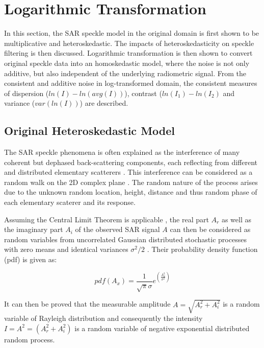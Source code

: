 \documentclass[journal]{IEEEtran}
\begin{document}
\section{Logarithmic Transformation}
\label{sec:log_transform}

In 
this section, the SAR speckle model in the original domain is first shown to be multiplicative and heteroskedastic.
The impacts of heteroskedasticity on speckle filtering is then discussed.
Logarithmic transformation is then shown to convert original speckle data into an homoskedastic model, 
	where the noise is not only additive, but also independent of the underlying radiometric signal.
From the consistent and additive noise in log-transformed domain,
    the consistent measures of dispersion ($ln(I)-ln(avg(I))$), contrast ($ln(I_1)-ln(I_2)$ and 
	variance ($var(ln(I))$) are described.

\subsection{Original Heteroskedastic Model}

The SAR speckle phenomena is often explained as the interference of many coherent but dephased back-scattering components,
	each reflecting from different and distributed elementary scatterers \cite{Oliver_ProcIEEE_1963, 
	Leith_ProcIEEE_1971}. This interference can be considered as a random walk on the 2D complex plane 
	\cite{Goodman_JOptSocAm_76}.  The random nature of the process arises due to the unknown random location, 
	height, distance and thus random phase of each elementary scaterer and its response.

Assuming the Central Limit Theorem is applicable \cite{Goodman_Springer_1975}, the real part $A_r$ as well as 
the imaginary part $A_i$ of the observed SAR signal $A$ can then be considered as random variables from 
uncorrelated Gaussian distributed stochastic processes with zero means and 
identical variances $\sigma^2/2$  \cite{Lee_CRCPress_2009}. Their probability density function (pdf) is given as:

\begin{equation}
\label{eqn:component_signal_pdf}
pdf(A_x)=\frac{1}{\sqrt{\pi} \sigma} e^{\left( \frac{A_x^2}{\sigma^2} \right) }
\end{equation}

It can then be proved that the measurable amplitude $A=\sqrt{A_r^2+A_i^2}$ is a random variable of Rayleigh 
distribution and consequently the intensity $I=A^2=(A_r^2+A_i^2)$ is a random variable of negative exponential 
distributed random process.
\end{document}
